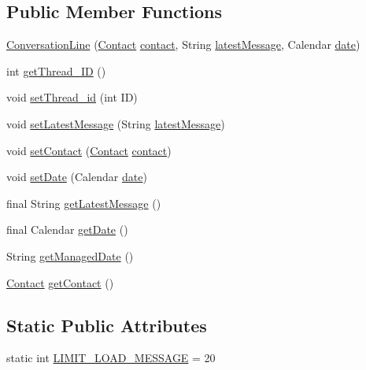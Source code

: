 \subsection*{Public Member Functions}
\begin{DoxyCompactItemize}
\item 
\hyperlink{a00009_a80a547afe975a7118b8cc354c41b2835}{Conversation\+Line} (\hyperlink{a00005}{Contact} \hyperlink{a00009_a3459849ab29ad684658dbcd0cf8c5d5a}{contact}, String \hyperlink{a00009_ae482a1ec09eba288cd2a19d22c3c9f3a}{latest\+Message}, Calendar \hyperlink{a00009_aa713d1025d73543bd4eae313a1868570}{date})
\item 
int \hyperlink{a00009_aebf2c5bb10824f5fcbd32677c8152735}{get\+Thread\+\_\+\+I\+D} ()
\item 
void \hyperlink{a00009_a27e124edc933b9954443e1b29b544bac}{set\+Thread\+\_\+id} (int I\+D)
\item 
void \hyperlink{a00009_a33f2ab55a4ba0636593f02f0322f3dd0}{set\+Latest\+Message} (String \hyperlink{a00009_ae482a1ec09eba288cd2a19d22c3c9f3a}{latest\+Message})
\item 
void \hyperlink{a00009_abef3c7b6635dc06ac6b8e4b37c51b37f}{set\+Contact} (\hyperlink{a00005}{Contact} \hyperlink{a00009_a3459849ab29ad684658dbcd0cf8c5d5a}{contact})
\item 
void \hyperlink{a00009_a65c1a5dad9225d01d585af72e0c80138}{set\+Date} (Calendar \hyperlink{a00009_aa713d1025d73543bd4eae313a1868570}{date})
\item 
final String \hyperlink{a00009_a10a2abf152f4957caca28c562fc33168}{get\+Latest\+Message} ()
\item 
final Calendar \hyperlink{a00009_a6d7bc612b8eee5382e11d9847e2f878e}{get\+Date} ()
\item 
String \hyperlink{a00009_aa53441954dd0352c8b8964194365c688}{get\+Managed\+Date} ()
\item 
\hyperlink{a00005}{Contact} \hyperlink{a00009_adb647c7ae09f1d5755db63d701968925}{get\+Contact} ()
\end{DoxyCompactItemize}
\subsection*{Static Public Attributes}
\begin{DoxyCompactItemize}
\item 
static int \hyperlink{a00009_a9d23fb3258cdafe6a3c4bb95f7ee886f}{L\+I\+M\+I\+T\+\_\+\+L\+O\+A\+D\+\_\+\+M\+E\+S\+S\+A\+G\+E} = 20
\end{DoxyCompactItemize}
